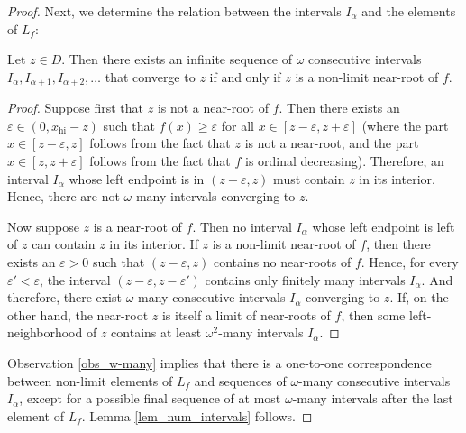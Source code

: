 \documentclass[10pt,a4paper]{amsart}
\begin{document}
\begin{proof}
Next, we determine the relation between the intervals $I_\alpha$ and the elements of $L_f$:


\begin{Observation}\label{obs_w-many}
    Let $z\in D$. Then there exists an infinite sequence of $\omega$ consecutive intervals $I_{\alpha}, I_{\alpha+1},\allowbreak I_{\alpha+2},\ldots$ that converge to $z$ if and only if $z$ is a non-limit near-root of $f$.
\end{Observation}

\begin{proof}
Suppose first that $z$ is not a near-root of $f$. Then there exists an $\varepsilon\in(0,x_{\mathrm{hi}}-z)$ such that $f(x)\ge\varepsilon$ for all $x\in [z-\varepsilon,z+\varepsilon]$ (where the part $x\in[z-\varepsilon, z]$ follows from the fact that $z$ is not a near-root, and the part $x\in[z, z+\varepsilon]$ follows from the fact that $f$ is ordinal decreasing). Therefore, an interval $I_\alpha$ whose left endpoint is in $(z-\varepsilon,z)$ must contain $z$ in its interior. Hence, there are not $\omega$-many intervals converging to $z$.

Now suppose $z$ is a near-root of $f$. Then no interval $I_\alpha$ whose left endpoint is left of $z$ can contain $z$ in its interior. If $z$ is a non-limit near-root of $f$, then there exists an $\varepsilon>0$ such that $(z-\varepsilon,z)$ contains no near-roots of $f$. Hence, for every $\varepsilon'<\varepsilon$, the interval $(z-\varepsilon,z-\varepsilon')$ contains only finitely many intervals $I_\alpha$. And therefore, there exist $\omega$-many consecutive intervals $I_\alpha$ converging to $z$. If, on the other hand, the near-root $z$ is itself a limit of near-roots of $f$, then some left-neighborhood of $z$ contains at least $\omega^2$-many intervals $I_\alpha$.
\end{proof}

Observation \ref{obs_w-many} implies that there is a one-to-one correspondence between non-limit elements of $L_f$ and sequences of $\omega$-many consecutive intervals $I_\alpha$, except for a possible final sequence of at most $\omega$-many intervals after the last element of $L_f$.
Lemma \ref{lem_num_intervals} follows.
\end{proof}
\end{document}
